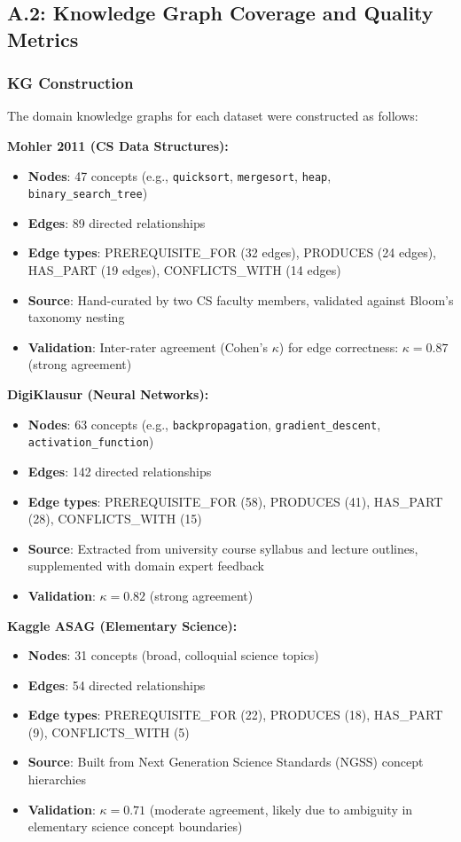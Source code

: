 \documentclass[journal,review]{vgtc}
\begin{document}
\subsection{A.2: Knowledge Graph Coverage and Quality Metrics}

\subsubsection{KG Construction}

The domain knowledge graphs for each dataset were constructed as follows:

\textbf{Mohler 2011 (CS Data Structures):}
\begin{itemize}
  \item \textbf{Nodes}: 47 concepts (e.g., \texttt{quicksort}, \texttt{mergesort}, \texttt{heap}, \texttt{binary\_search\_tree})
  \item \textbf{Edges}: 89 directed relationships
  \item \textbf{Edge types}: PREREQUISITE\_FOR (32 edges), PRODUCES (24 edges), HAS\_PART (19 edges), CONFLICTS\_WITH (14 edges)
  \item \textbf{Source}: Hand-curated by two CS faculty members, validated against Bloom's taxonomy nesting
  \item \textbf{Validation}: Inter-rater agreement (Cohen's $\kappa$) for edge correctness: $\kappa = 0.87$ (strong agreement)
\end{itemize}

\textbf{DigiKlausur (Neural Networks):}
\begin{itemize}
  \item \textbf{Nodes}: 63 concepts (e.g., \texttt{backpropagation}, \texttt{gradient\_descent}, \texttt{activation\_function})
  \item \textbf{Edges}: 142 directed relationships
  \item \textbf{Edge types}: PREREQUISITE\_FOR (58), PRODUCES (41), HAS\_PART (28), CONFLICTS\_WITH (15)
  \item \textbf{Source}: Extracted from university course syllabus and lecture outlines, supplemented with domain expert feedback
  \item \textbf{Validation}: $\kappa = 0.82$ (strong agreement)
\end{itemize}

\textbf{Kaggle ASAG (Elementary Science):}
\begin{itemize}
  \item \textbf{Nodes}: 31 concepts (broad, colloquial science topics)
  \item \textbf{Edges}: 54 directed relationships
  \item \textbf{Edge types}: PREREQUISITE\_FOR (22), PRODUCES (18), HAS\_PART (9), CONFLICTS\_WITH (5)
  \item \textbf{Source}: Built from Next Generation Science Standards (NGSS) concept hierarchies
  \item \textbf{Validation}: $\kappa = 0.71$ (moderate agreement, likely due to ambiguity in elementary science concept boundaries)
\end{itemize}
\end{document}
